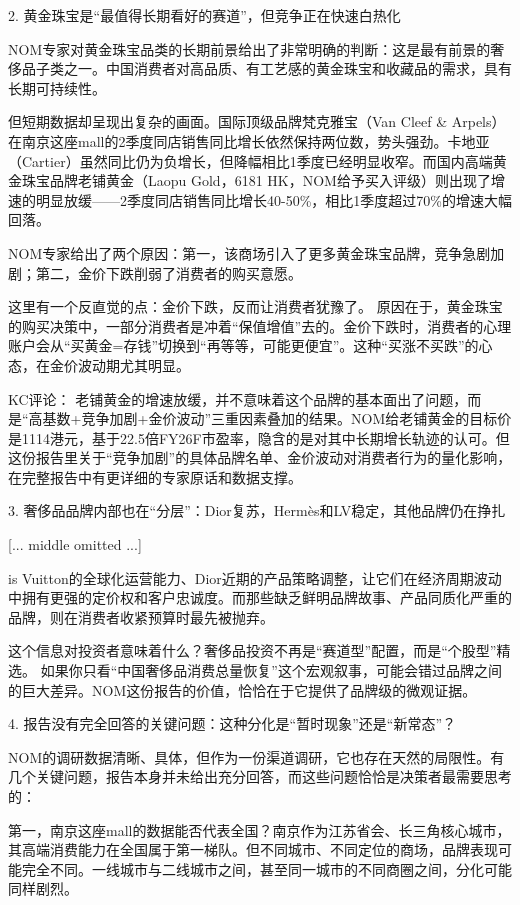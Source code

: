 \documentclass[11pt]{ctexart}
\begin{document}
2. 黄金珠宝是“最值得长期看好的赛道”，但竞争正在快速白热化

NOM专家对黄金珠宝品类的长期前景给出了非常明确的判断：这是最有前景的奢侈品子类之一。中国消费者对高品质、有工艺感的黄金珠宝和收藏品的需求，具有长期可持续性。

但短期数据却呈现出复杂的画面。国际顶级品牌梵克雅宝（Van Cleef \& Arpels）在南京这座mall的2季度同店销售同比增长依然保持两位数，势头强劲。卡地亚（Cartier）虽然同比仍为负增长，但降幅相比1季度已经明显收窄。而国内高端黄金珠宝品牌老铺黄金（Laopu Gold，6181 HK，NOM给予买入评级）则出现了增速的明显放缓——2季度同店销售同比增长40-50\%，相比1季度超过70\%的增速大幅回落。

NOM专家给出了两个原因：第一，该商场引入了更多黄金珠宝品牌，竞争急剧加剧；第二，金价下跌削弱了消费者的购买意愿。

这里有一个反直觉的点：金价下跌，反而让消费者犹豫了。 原因在于，黄金珠宝的购买决策中，一部分消费者是冲着“保值增值”去的。金价下跌时，消费者的心理账户会从“买黄金=存钱”切换到“再等等，可能更便宜”。这种“买涨不买跌”的心态，在金价波动期尤其明显。

KC评论： 老铺黄金的增速放缓，并不意味着这个品牌的基本面出了问题，而是“高基数+竞争加剧+金价波动”三重因素叠加的结果。NOM给老铺黄金的目标价是1114港元，基于22.5倍FY26F市盈率，隐含的是对其中长期增长轨迹的认可。但这份报告里关于“竞争加剧”的具体品牌名单、金价波动对消费者行为的量化影响，在完整报告中有更详细的专家原话和数据支撑。

3. 奢侈品品牌内部也在“分层”：Dior复苏，Hermès和LV稳定，其他品牌仍在挣扎



[... middle omitted ...]

is Vuitton的全球化运营能力、Dior近期的产品策略调整，让它们在经济周期波动中拥有更强的定价权和客户忠诚度。而那些缺乏鲜明品牌故事、产品同质化严重的品牌，则在消费者收紧预算时最先被抛弃。

这个信息对投资者意味着什么？奢侈品投资不再是“赛道型”配置，而是“个股型”精选。 如果你只看“中国奢侈品消费总量恢复”这个宏观叙事，可能会错过品牌之间的巨大差异。NOM这份报告的价值，恰恰在于它提供了品牌级的微观证据。

4. 报告没有完全回答的关键问题：这种分化是“暂时现象”还是“新常态”？

NOM的调研数据清晰、具体，但作为一份渠道调研，它也存在天然的局限性。有几个关键问题，报告本身并未给出充分回答，而这些问题恰恰是决策者最需要思考的：

第一，南京这座mall的数据能否代表全国？南京作为江苏省会、长三角核心城市，其高端消费能力在全国属于第一梯队。但不同城市、不同定位的商场，品牌表现可能完全不同。一线城市与二线城市之间，甚至同一城市的不同商圈之间，分化可能同样剧烈。
\end{document}
